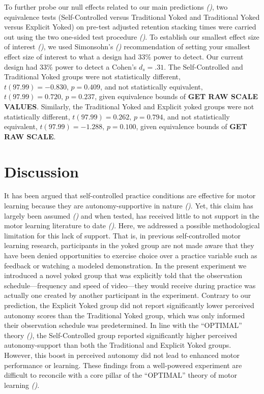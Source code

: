 \documentclass[
  english,
  jou]{apa7}
\begin{document}
To further probe our null effects related to our main predictions \emph{()}, two equivalence tests (Self-Controlled versus Traditional Yoked and Traditional Yoked versus Explicit Yoked) on pre-test adjusted retention stacking times were carried out using the two one-sided test procedure \emph{()}. To establish our smallest effect size of interest \emph{()}, we used Simonsohn's \emph{()} recommendation of setting your smallest effect size of interest to what a design had 33\% power to detect. Our current design had 33\% power to detect a Cohen's \(d_{s} = .31\). The Self-Controlled and Traditional Yoked groups were not statistically different, \(t(97.99) = -0.830, \,p = 0.409\), and not statistically equivalent, \(t(97.99) = 0.720, \,p = 0.237\), given equivalence bounds of \textbf{GET RAW SCALE VALUES}. Similarly, the Traditional Yoked and Explicit yoked groups were not statistically different, \(t(97.99) = 0.262, \,p = 0.794\), and not statistically equivalent, \(t(97.99) = -1.288, \,p = 0.100\), given equivalence bounds of \textbf{GET RAW SCALE}.

\hypertarget{discussion}{%
\section{Discussion}\label{discussion}}

It has been argued that self-controlled practice conditions are effective for motor learning because they are autonomy-supportive in nature \emph{()}. Yet, this claim has largely been assumed \emph{()} and when tested, has received little to not support in the motor learning literature to date \emph{()}. Here, we addressed a possible methodological limitation for this lack of support. That is, in previous self-controlled motor learning research, participants in the yoked group are not made aware that they have been denied opportunities to exercise choice over a practice variable such as feedback or watching a modeled demonstration. In the present experiment we introduced a novel yoked group that was explicitly told that the observation schedule---frequency and speed of video---they would receive during practice was actually one created by another participant in the experiment. Contrary to our prediction, the Explicit Yoked group did not report significantly lower perceived autonomy scores than the Traditional Yoked group, which was only informed their observation schedule was predetermined. In line with the ``OPTIMAL'' theory \emph{()}, the Self-Controlled group reported significantly higher perceived autonomy-support than both the Traditional and Explicit Yoked groups. However, this boost in perceived autonomy did not lead to enhanced motor performance or learning. These findings from a well-powered experiment are difficult to reconcile with a core pillar of the ``OPTIMAL'' theory of motor learning \emph{()}.
\end{document}
